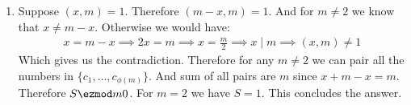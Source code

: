 \begin{enumerate}[label=]
    \item 
        Suppose $(x, m) = 1$. Therefore $(m - x, m) = 1$. And for $m \ne 2$ we know that $x \ne m - x$. Otherwise we would have:
        \begin{gather*}
            x = m - x \implies 2x = m \implies x = \frac{m}{2} \implies x \mid m \implies (x, m) \ne 1
        \end{gather*}
        Which gives us the contradiction. Therefore for any $m \ne 2$ we can pair all the numbers in $\{c_1, \dots, c_{\phi(m)}\}$. And sum of all pairs are $m$ since $x + m - x = m$. Therefore $S \ezmod m 0$. For $m = 2$ we have $S = 1$. This concludes the answer.
\end{enumerate}